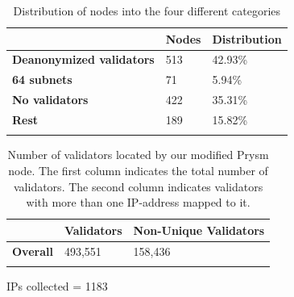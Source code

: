 \begin{table}[]
    \centering
    \begin{tabular}{lll}
        \hline
        & \textbf{Nodes} & \textbf{Distribution} \\ \hline
        \textbf{Deanonymized validators} & 513            & 42.93\%                 \\
        \textbf{64 subnets}              & 71             & 5.94\%                  \\
        \textbf{No validators}           & 422              & 35.31\%               \\
        \textbf{Rest}                    & 189            & 15.82\%                 \\ \hline
        \\
    \end{tabular}
    \caption{Distribution of nodes into the four different categories}
    \label{tab:distribution}
\end{table}


\begin{table}[]
    \centering
    \begin{tabular}{lll}
        \hline
        & \textbf{Validators} & \textbf{Non-Unique Validators} \\ \hline
        \textbf{Overall} & 493,551             & 158,436                        \\ \hline
        \\
    \end{tabular}
    \caption{Number of validators located by our modified Prysm node. The first column indicates the total number of validators. The second column indicates validators with more than one IP-address mapped to it.}
    \label{tab:unique vals}
\end{table}

IPs collected = 1183

